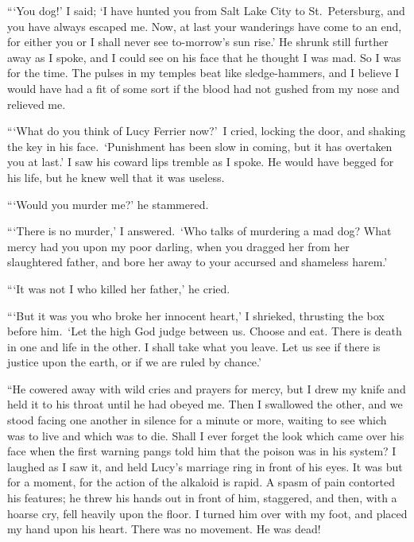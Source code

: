 \documentclass[12pt,english,oneside]{book}
\begin{document}
{}```You dog!' I said; `I have hunted you from Salt Lake City to
St.\ Petersburg, and you have always escaped me. Now, at last your
wanderings have come to an end, for either you or I shall never see
to-morrow's sun rise.' He shrunk still further away as I spoke, and
I could see on his face that he thought I was mad. So I was for the
time. The pulses in my temples beat like sledge-hammers, and I believe
I would have had a fit of some sort if the blood had not gushed from
my nose and relieved me.

{}```What do you think of Lucy Ferrier now?'\ I cried, locking the
door, and shaking the key in his face.\  `Punishment has been slow
in coming, but it has overtaken you at last.' I saw his coward lips
tremble as I spoke. He would have begged for his life, but he knew
well that it was useless.

{}```Would you murder me?' he stammered.

{}```There is no murder,' I answered.\  `Who talks of murdering
a mad dog? What mercy had you upon my poor darling, when you dragged
her from her slaughtered father, and bore her away to your accursed
and shameless harem.'

{}```It was not I who killed her father,' he cried.

{}```But it was you who broke her innocent heart,' I shrieked, thrusting
the box before him.\  `Let the high God judge between us. Choose
and eat. There is death in one and life in the other. I shall take
what you leave. Let us see if there is justice upon the earth, or
if we are ruled by chance.'

{}``He cowered away with wild cries and prayers for mercy, but I
drew my knife and held it to his throat until he had obeyed me. Then
I swallowed the other, and we stood facing one another in silence
for a minute or more, waiting to see which was to live and which was
to die. Shall I ever forget the look which came over his face when
the first warning pangs told him that the poison was in his system?
I laughed as I saw it, and held Lucy's marriage ring in front of his
eyes. It was but for a moment, for the action of the alkaloid is rapid.
A spasm of pain contorted his features; he threw his hands out in
front of him, staggered, and then, with a hoarse cry, fell heavily
upon the floor. I turned him over with my foot, and placed my hand
upon his heart. There was no movement. He was dead!
\end{document}
